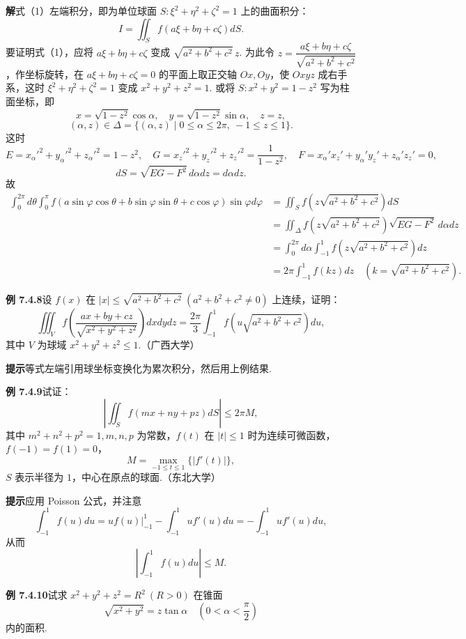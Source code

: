 \documentclass[UTF8, 12pt, fontset=fandol, oneside]{ctexart}
\begin{document}
\noindent\textbf{解}\quad 式（1）左端积分，即为单位球面 $S:\xi^2+\eta^2+\zeta^2=1$ 上的曲面积分：
\[
I=\iint_Sf(a\xi+b\eta+c\zeta)dS.
\]
要证明式（1），应将 $a\xi+b\eta+c\zeta$ 变成 $\sqrt{a^2+b^2+c^2}\,z$. 为此令 $z=\dfrac{a\xi+b\eta+c\zeta}{\sqrt{a^2+b^2+c^2}}$，作坐标旋转，在 $a\xi+b\eta+c\zeta=0$ 的平面上取正交轴 $Ox,Oy$，使 $Oxyz$ 成右手系，这时 $\xi^2+\eta^2+\zeta^2=1$ 变成 $x^2+y^2+z^2=1$. 或将 $S:x^2+y^2=1-z^2$ 写为柱面坐标，即
\[
x=\sqrt{1-z^2}\cos\alpha,\quad
y=\sqrt{1-z^2}\sin\alpha,\quad z=z,
\]
\[
(\alpha,z)\in\Delta=\{(\alpha,z)\mid0\le\alpha\le2\pi,\ -1\le z\le1\}.
\]
这时
\[
E=x_\alpha'^2+y_\alpha'^2+z_\alpha'^2=1-z^2,\quad
G=x_z'^2+y_z'^2+z_z'^2=\frac1{1-z^2},\quad
F=x_\alpha'x_z'+y_\alpha'y_z'+z_\alpha'z_z'=0,
\]
\[
dS=\sqrt{EG-F^2}\,d\alpha dz=d\alpha dz.
\]
故
\[
\begin{aligned}
\int_0^{2\pi}d\theta\int_0^\pi
f(a\sin\varphi\cos\theta+b\sin\varphi\sin\theta+c\cos\varphi)\sin\varphi d\varphi
&=\iint_Sf\left(z\sqrt{a^2+b^2+c^2}\right)dS\\
&=\iint_\Delta f\left(z\sqrt{a^2+b^2+c^2}\right)\sqrt{EG-F^2}\,d\alpha dz\\
&=\int_0^{2\pi}d\alpha\int_{-1}^1f\left(z\sqrt{a^2+b^2+c^2}\right)dz\\
&=2\pi\int_{-1}^1f(kz)dz\quad(k=\sqrt{a^2+b^2+c^2}).
\end{aligned}
\]

\noindent\textbf{例 7.4.8}\quad 设 $f(x)$ 在 $|x|\le\sqrt{a^2+b^2+c^2}\ (a^2+b^2+c^2\ne0)$ 上连续，证明：
\[
\iiint_Vf\left(\frac{ax+by+cz}{\sqrt{x^2+y^2+z^2}}\right)dxdydz
=\frac{2\pi}3\int_{-1}^1f\left(u\sqrt{a^2+b^2+c^2}\right)du,
\]
其中 $V$ 为球域 $x^2+y^2+z^2\le1$.（广西大学）

\noindent\textbf{提示}\quad 等式左端引用球坐标变换化为累次积分，然后用上例结果.

\noindent\textbf{例 7.4.9}\quad 试证：
\[
\left|\iint_S f(mx+ny+pz)dS\right|\le 2\pi M,
\]
其中 $m^2+n^2+p^2=1,m,n,p$ 为常数，$f(t)$ 在 $|t|\le1$ 时为连续可微函数，$f(-1)=f(1)=0$，
\[
M=\max_{-1\le t\le1}\{|f'(t)|\},
\]
$S$ 表示半径为 $1$，中心在原点的球面.（东北大学）

\noindent\textbf{提示}\quad 应用 Poisson 公式，并注意
\[
\int_{-1}^1f(u)du=uf(u)\big|_{-1}^1-\int_{-1}^1uf'(u)du
=-\int_{-1}^1uf'(u)du,
\]
从而
\[
\left|\int_{-1}^1f(u)du\right|\le M.
\]

\noindent\textbf{例 7.4.10}\quad 试求 $x^2+y^2+z^2=R^2\ (R>0)$ 在锥面
\[
\sqrt{x^2+y^2}=z\tan\alpha\quad\left(0<\alpha<\frac\pi2\right)
\]
内的面积.
\end{document}

